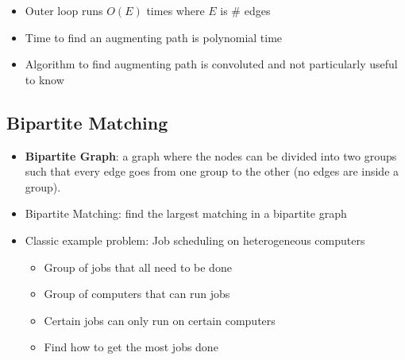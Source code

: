 \documentclass[12pt, letter]{article}
\begin{document}
\begin{itemize}
    \item Outer loop runs $O(E)$ times where $E$ is # edges
    \item Time to find an augmenting path is polynomial time
    \item Algorithm to find augmenting path is convoluted and not particularly useful to know
\end{itemize}

\subsection*{Bipartite Matching}
\begin{itemize}
    \item \textbf{Bipartite Graph}: a graph where the nodes can be divided into two groups such that every edge goes from one group to the other (no edges are inside a group).
    \item Bipartite Matching: find the largest matching in a bipartite graph
    \item Classic example problem: Job scheduling on heterogeneous computers
    \begin{itemize}
        \item Group of jobs that all need to be done
        \item Group of computers that can run jobs
        \item Certain jobs can only run on certain computers
        \item Find how to get the most jobs done
    \end{itemize}
\end{itemize}
\end{document}
